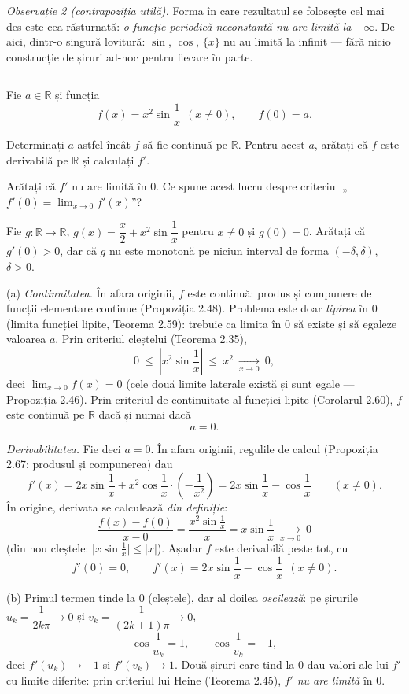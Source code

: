 \emph{Observație 2 (contrapoziția utilă).} Forma în care rezultatul se folosește cel mai des este cea răsturnată: \emph{o funcție periodică neconstantă nu are limită la $+\infty$}. De aici, dintr-o singură lovitură: $\sin$, $\cos$, $\{x\}$ nu au limită la infinit --- fără nicio construcție de șiruri ad-hoc pentru fiecare în parte.
\vspace{1mm}\hrule

Fie $a\in\mathbb{R}$ și funcția
\[ f(x)=x^{2}\sin\frac{1}{x}\ \ (x\neq0),\qquad f(0)=a . \]
\begin{parti}
  \item Determinați $a$ astfel încât $f$ să fie continuă pe $\mathbb{R}$. Pentru acest $a$, arătați că $f$ este derivabilă pe $\mathbb{R}$ și calculați $f'$.
  \item Arătați că $f'$ nu are limită în $0$. Ce spune acest lucru despre criteriul „$f'(0)=\lim_{x\to0}f'(x)$''?
  \item Fie $g:\mathbb{R}\to\mathbb{R}$, $g(x)=\dfrac x2+x^{2}\sin\dfrac1x$ pentru $x\neq0$ și $g(0)=0$. Arătați că $g'(0)>0$, dar că $g$ nu este monotonă pe niciun interval de forma $(-\delta,\delta)$, $\delta>0$.
\end{parti}
\sol (a) \emph{Continuitatea.} În afara originii, $f$ este continuă: produs și compunere de funcții elementare continue (Propoziția 2.48). Problema este doar \emph{lipirea} în $0$ (limita funcției lipite, Teorema 2.59): trebuie ca limita în $0$ să existe și să egaleze valoarea $a$. Prin criteriul cleștelui (Teorema 2.35),
\[ 0\ \le\ \left|x^{2}\sin\frac1x\right|\ \le\ x^{2}\ \xrightarrow[x\to0]{}\ 0 , \]
deci $\displaystyle\lim_{x\to0}f(x)=0$ (cele două limite laterale există și sunt egale --- Propoziția 2.46). Prin criteriul de continuitate al funcției lipite (Corolarul 2.60), $f$ este continuă pe $\mathbb{R}$ dacă și numai dacă
\[ a=0 . \]

\emph{Derivabilitatea.} Fie deci $a=0$. În afara originii, regulile de calcul (Propoziția 2.67: produsul și compunerea) dau
\[ f'(x)=2x\sin\frac1x+x^{2}\cos\frac1x\cdot\left(-\frac{1}{x^{2}}\right)=2x\sin\frac1x-\cos\frac1x\qquad(x\neq0) . \]
În origine, derivata se calculează \emph{din definiție}:
\[ \frac{f(x)-f(0)}{x-0}=\frac{x^{2}\sin\frac1x}{x}=x\sin\frac1x\ \xrightarrow[x\to0]{}\ 0 \]
(din nou cleștele: $\bigl|x\sin\frac1x\bigr|\le|x|$). Așadar $f$ este derivabilă peste tot, cu
\[ f'(0)=0,\qquad f'(x)=2x\sin\frac1x-\cos\frac1x\ \ (x\neq0) . \]

(b) Primul termen tinde la $0$ (cleștele), dar al doilea \emph{oscilează}: pe șirurile $u_{k}=\dfrac{1}{2k\pi}\to0$ și $v_{k}=\dfrac{1}{(2k+1)\pi}\to0$,
\[ \cos\frac{1}{u_{k}}=1,\qquad \cos\frac{1}{v_{k}}=-1 , \]
deci $f'(u_{k})\to-1$ și $f'(v_{k})\to1$. Două șiruri care tind la $0$ dau valori ale lui $f'$ cu limite diferite: prin criteriul lui Heine (Teorema 2.45), $f'$ \emph{nu are limită} în $0$.

